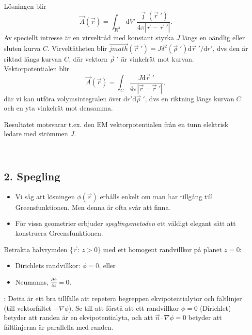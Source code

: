 \documentclass[%
oneside,                 %
final,                   %
10pt]{article}
\newcommand{\longinlinecomment}[3]{{\color{red}{\bf #1}: #2}}
\begin{document}
Lösningen blir
$$
\vec A(\vec{r})=\int_{\mathbf{R}^3} \mbox{d}V'\, \frac{\vec\jmath(\vec{r}{\;}')}{4\pi|\vec{r}-\vec{r}{\;}'|}.
$$
Av speciellt intresse är en virveltråd med konstant styrka $J$ längs en oändlig eller sluten kurva $C$. Virveltätheten blir $\vec{jmath}(\vec{r}{\;}') = J \delta^2(\vec{\rho}{\;}') \mbox{d}\vec{r}{\;}' / \mbox{d}r'$, dvs den är riktad längs kurvan $C$, där vektorn $\vec{\rho}{\;}'$ är vinkelrät mot kurvan. Vektorpotentialen blir
$$
\vec A(\vec{r})=\int_C \frac{J \mbox{d}\vec{r}{\;}'}{4\pi|\vec{r}-\vec{r}{\;}'|},
$$
där vi kan utföra volymsintegralen över $\mbox{d}r'\mbox{d}\vec{\rho}{\;}'$, dvs en riktning längs kurvan $C$ och en yta vinkelrät mot densamma.

Resultatet motsvarar t.ex. den EM vektorpotentialen från en tunn elektrisk ledare med strömmen $J$.

---------------------------------------------------------

\subsection{2. Spegling}

\begin{itemize}
\item Vi såg att lösningen $\phi(\vec{r})$ erhålls enkelt om man har tillgång till Greensfunktionen. Men denna är ofta svår att finna. 

\item För vissa geometrier erbjuder \emph{speglingsmetoden} ett väldigt elegant sätt att konstruera Greensfunktionen.
\end{itemize}

\noindent
Betrakta halvrymden $\{\vec{r}:\,z>0\}$ med ett homogent randvillkor på planet
$z=0$: 
\begin{itemize}
\item Dirichlets randvillkor: $\phi=0$, eller 

\item Neumanns, $\frac{\partial \phi}{\partial z} = 0$.
\end{itemize}

\noindent
\longinlinecomment{Comment 3}{ Detta är ett bra tillfälle att repetera begreppen ekvipotentialytor och fältlinjer (till vektorfältet $-\nabla\phi$). Se till att förstå att ett randvillkor $\phi=0$ (Dirichlet) betyder att randen är en ekvipotentialyta, och att $\vec n \cdot \nabla\phi=0$ betyder att fältlinjerna är parallella med randen. }{ Detta är ett bra }
\end{document}
